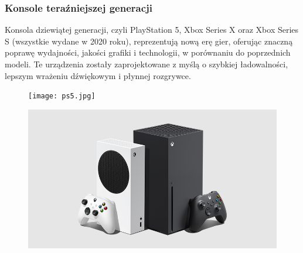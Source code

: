 \documentclass[8pt]{beamer}
\begin{document}
\begin{frame}
\frametitle{Konsole teraźniejszej generacji}

Konsola dziewiątej generacji, czyli PlayStation 5, Xbox Series X oraz Xbox Series S (wszystkie wydane w 2020 roku), reprezentują nową erę gier, oferując znaczną poprawę wydajności, jakości grafiki i technologii, w porównaniu do poprzednich modeli. 
Te urządzenia zostały zaprojektowane z myślą o szybkiej ładowalności, lepszym wrażeniu dźwiękowym i płynnej rozgrywce.
    \begin{figure}[ht]
        \begin{minipage}[b]{0.45\linewidth}
            \centering
            \texttt{[image: ps5.jpg]}
        \end{minipage}
        \hspace{0.5cm}
        \begin{minipage}[b]{0.45\linewidth}
            \centering
            \includegraphics[width=\textwidth]{xseries.png}
        \end{minipage}
    \end{figure}
\end{frame}
\end{document}
